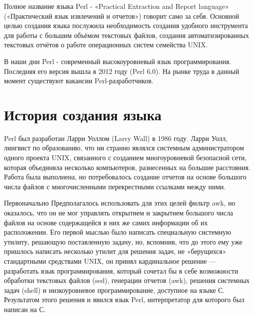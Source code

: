 \documentclass[spec, och, referat, times]{SCWorks}
\begin{document}


\tableofcontents




\intro
Полное название языка Perl - «Practical Extraction and Report language» («Практический язык извлечений и отчетов») говорит само за себя. Основной целью создания языка послужила необходимость создания удобного инструмента для работы с большим объёмом текстовых файлов, создания автоматизированных текстовых отчётов о работе операционных систем семейства UNIX. 

В наши дни Perl - современный высокоуровневый язык программирования. Последняя его версия вышла в 2012 году (Perl 6.0). На рынке труда в данный момент существуют вакансии Perl-разработчиков.





\section{История создания языка}

Perl был разработан Ларри Уоллом (Larry Wall) в 1986 году. Ларри Уолл, лингвист по образованию, что ни странно являлся системным администратором одного проекта UNIX, связанного с созданием многоуровневой безопасной сети, которая объединяла несколько компьютеров, разнесенных на большие расстояния. Работа была выполнена, но потребовалось создание отчетов на основе большого числа файлов с многочисленными перекрестными ссылками между ними.

Первоначально Предполагалось использовать для этих целей фильтр awk, но оказалось, что он не мог управлять открытием и закрытием большого числа файлов на основе содержащейся в них же самих информации об их расположении. Его первой мыслью было написать специальную системную утилиту, решающую поставленную задачу, но, вспомнив, что до этого ему уже пришлось написать несколько утилит для решения задач, не «берущихся» стандартными средствами UNIX, он принял кардинальное решение — разработать язык программирования, который сочетал бы в себе возможности обработки текстовых файлов (sed), генерации отчетов (awk), решения системных задач (shell) и низкоуровневое программирование, доступное на языке С. Результатом этого решения и явился язык Perl, интерпретатор для которого был написан на С.
\end{document}

